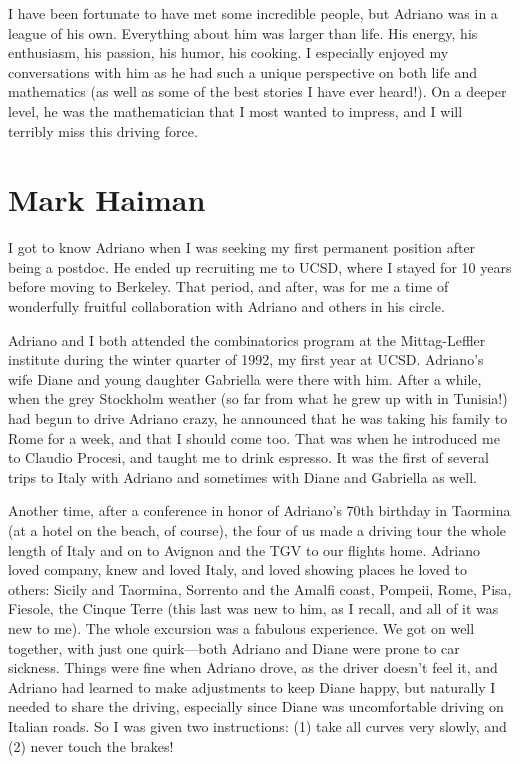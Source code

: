 \documentclass{notices}
\begin{document}
I have been fortunate to have met some incredible people, but Adriano was in a league of his own. Everything about him was larger than life. His energy, his enthusiasm, his passion, his humor, his cooking. I especially enjoyed my conversations with him as he had such a unique perspective  on both life and  mathematics (as well as some of the best stories I have ever heard!). On a deeper level, he was the mathematician that I most wanted to impress, and I will terribly miss this driving force.

\section*{Mark Haiman}
I got to know Adriano when I was seeking my first permanent position after being a postdoc.  He ended up recruiting me to UCSD, where I stayed for 10 years before moving to Berkeley.  That period, and after, was for me a time of wonderfully fruitful collaboration with Adriano and others in his circle.

Adriano and I both attended the combinatorics program at the Mittag-Leffler institute during the winter quarter of 1992, my first year at UCSD.   Adriano's wife Diane and young daughter Gabriella were there with him.  After a while, when the grey Stockholm weather (so far from what he grew up with in Tunisia!) had begun to drive Adriano crazy, he announced that he was taking his family to Rome for a week, and that I should come too.  That was when he introduced me to Claudio Procesi, and taught me to drink espresso.  It was the first of several trips to Italy with Adriano and sometimes with Diane and Gabriella as well.

Another time, after a conference in honor of Adriano's 70th birthday in Taormina (at a hotel on the beach, of course), the four of us made a driving tour the whole length of Italy and on to Avignon and the TGV to our flights home.  Adriano loved company, knew and loved Italy, and loved showing places he loved to others: Sicily and Taormina, Sorrento and the Amalfi coast, Pompeii, Rome, Pisa, Fiesole, the Cinque Terre (this last was new to him, as I recall, and all of it was new to me).  The whole excursion was a fabulous experience.  We got on well together, with just one quirk---both Adriano and Diane were prone to car sickness.  Things were fine when Adriano drove, as the driver doesn't feel it, and Adriano had learned to make adjustments to keep Diane happy, but naturally I needed to share the driving, especially since Diane was uncomfortable driving on Italian roads.  So I was given two instructions: (1) take all curves very slowly, and (2) never touch the brakes!
\end{document}
